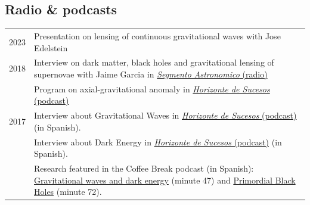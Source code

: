 \documentclass[11pt,a4paper]{article}
\begin{document}
%  



\subsection*{Radio \& podcasts}
\vspace{-.3cm}
\begin{longtable}{c p{15cm}}
 2023 & {Presentation on lensing of continuous gravitational waves} with Jose Edelstein %
\\[2pt]
 2018 & {Interview on dark matter, black holes and gravitational lensing of supernovae} with Jaime Garcia in \href{https://youtu.be/lyETW384gE8}{{\it Segmento Astronomico} (radio)} 
\\[2pt]
 & {Program on axial-gravitational anomaly} in \href{https://www.ivoox.com/podcast-horizonte-sucesos-cine-ciencia-entre_sq_f1432346_1.html}{{\it Horizonte de Sucesos} (podcast)} 
\\[2pt]
2017  & {Interview about Gravitational Waves} in \href{https://www.spreaker.com/user/horizontedesucesos/horizonte-de-sucesos-ondas-gravitacional}{{\it Horizonte de Sucesos} (podcast)} (in Spanish).
\\[2pt]
 & {Interview about Dark Energy} in \href{https://www.spreaker.com/user/horizontedesucesos/la-energia-oscura-2-parte-14-09-17}{{\it Horizonte de Sucesos} (podcast)} (in Spanish).
\\[2pt]
& Research featured in the {Coffee Break podcast} (in Spanish): \href{https://xn--sealyruido-u9a.com/?p=1216}{Gravitational waves and dark energy} (minute 47) and \href{https://xn--sealyruido-u9a.com/?p=1285}{Primordial Black Holes} (minute 72).  \\[2pt]
\end{longtable}
\vspace{-0.3cm}
\end{document}
